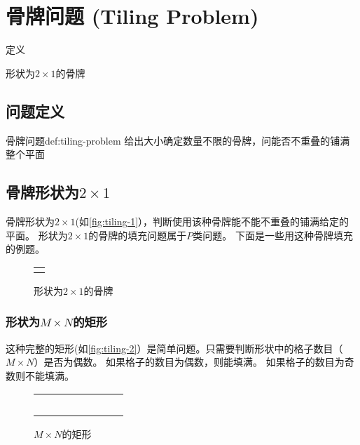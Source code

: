 \chapter{骨牌问题 (Tiling Problem)}

\begin{introduction}
	\item 定义
	\item 形状为$2\times1$的骨牌
\end{introduction}

\section{问题定义}\label{sec:tiling-1}
\begin{definition}{骨牌问题}{def:tiling-problem}
	给出大小确定数量不限的骨牌，问能否不重叠的铺满整个平面
\end{definition}

\section{骨牌形状为\texorpdfstring{$2\times1$}{}}\label{sec:tiling-2}
骨牌形状为$2\times1$(如\autoref{fig:tiling-1}），判断使用该种骨牌能不能不重叠的铺满给定的平面。
形状为$2\times1$的骨牌的填充问题属于$P$类问题。
下面是一些用这种骨牌填充的例题。
\begin{figure}[hbt!]
	\centering
	\begin{tabular}{|c|}
		\hline
		\\ \hline
		\\ \hline
	\end{tabular}
	\caption{形状为$2\times1$的骨牌}
	\label{fig:tiling-1}
\end{figure}
\subsection{形状为\texorpdfstring{$M\times N$}{}的矩形}\label{subsec:tiling-2-1}
这种完整的矩形(如\autoref{fig:tiling-2}）是简单问题。只需要判断形状中的格子数目（$M\times N$）是否为偶数。
如果格子的数目为偶数，则能填满。
如果格子的数目为奇数则不能填满。
\begin{figure}[hbt!]
	\centering
	\begin{tabular}{|c|c|c|c@{\dots}c|c|c|c|}
		\cline{1-3} \cline{6-8}
		                     &  &                      &  &  &  &  & \\
		\cline{1-3} \cline{6-8}
		                     &  &                      &  &  &  &  & \\
		\cline{1-3} \cline{6-8}
		\multicolumn{3}{c}{} &  & \multicolumn{3}{c}{}               \\
		\cline{1-3} \cline{6-8}
		                     &  &                      &  &  &  &  & \\
		\cline{1-3} \cline{6-8}
		                     &  &                      &  &  &  &  & \\
		\cline{1-3} \cline{6-8}
	\end{tabular}
	\caption{$M\times N$的矩形}\label{fig:tiling-2}
\end{figure}


